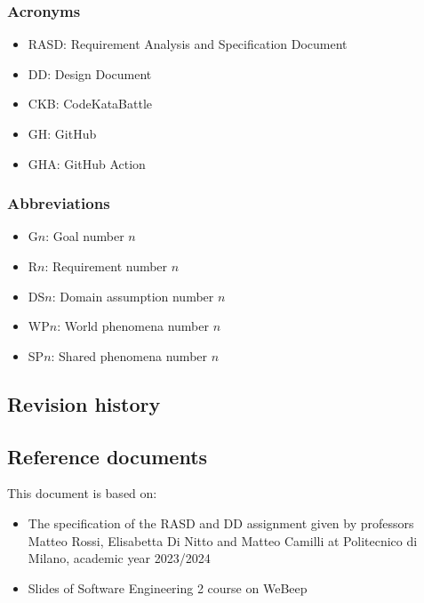 \subsubsection{Acronyms}
\begin{itemize}
    \item RASD: Requirement Analysis and Specification Document
    \item DD: Design Document
    \item CKB: CodeKataBattle
    \item GH: GitHub
    \item GHA: GitHub Action
\end{itemize}

\subsubsection{Abbreviations}
\begin{itemize}
    \item G$n$: Goal number $n$
    \item R$n$: Requirement number $n$
    \item DS$n$: Domain assumption number $n$
    \item WP$n$: World phenomena number $n$
    \item SP$n$: Shared phenomena number $n$
\end{itemize}

\subsection{Revision history}

\subsection{Reference documents}
This document is based on:
\begin{itemize}
    \item The specification of the RASD and DD assignment given by professors Matteo Rossi, Elisabetta Di Nitto and Matteo Camilli at Politecnico di Milano, academic year 2023/2024
    \item Slides of Software Engineering 2 course on WeBeep
\end{itemize}

